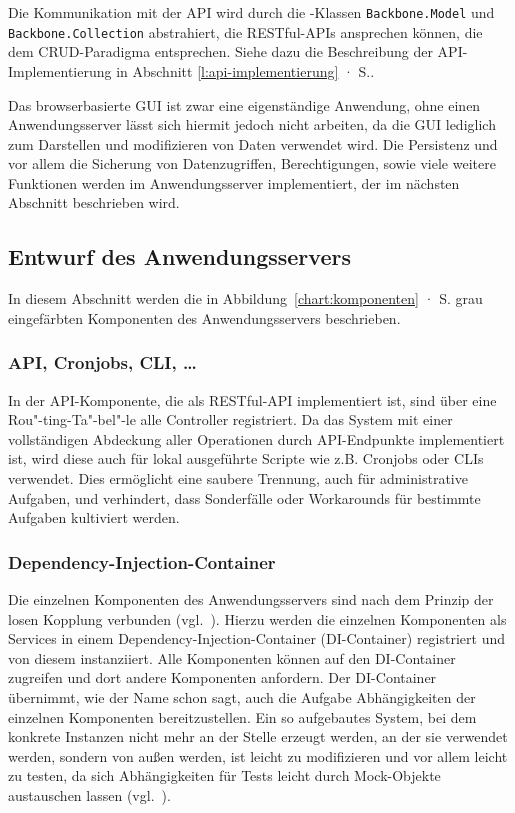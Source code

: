 Die Kommunikation mit der API wird durch die -Klassen \texttt{Backbone.Model} und \texttt{Backbone.Collection} abstrahiert, die RESTful-APIs ansprechen können, die dem CRUD-Paradigma entsprechen. Siehe dazu die Beschreibung der API-Implementierung in Abschnitt \ref{l:api-implementierung} · S.\pageref{l:api-implementierung}.

\secbar

Das browserbasierte GUI ist zwar eine eigenständige Anwendung, ohne einen Anwendungsserver lässt sich hiermit jedoch nicht arbeiten, da die GUI lediglich zum Darstellen und modifizieren von Daten verwendet wird. Die Persistenz und vor allem die Sicherung von Datenzugriffen, Berechtigungen, sowie viele weitere Funktionen werden im Anwendungsserver implementiert, der im nächsten Abschnitt beschrieben wird.

\pagebreak

\subsection{Entwurf des Anwendungsservers}\label{l:entwurf-server}

In diesem Abschnitt werden die in Abbildung~\ref{chart:komponenten} · S.\pageref{chart:komponenten} grau eingefärbten Komponenten des Anwendungsservers beschrieben.

\subsubsection{API, Cronjobs, CLI, …}

In der API-Komponente, die als RESTful-API implementiert ist, sind über eine Rou"-ting-Ta"-bel"-le alle Controller registriert. Da das System mit einer vollständigen Abdeckung aller Operationen durch API-Endpunkte implementiert ist, wird diese auch für lokal ausgeführte Scripte wie z.B. Cronjobs oder CLIs verwendet. Dies ermöglicht eine saubere Trennung, auch für administrative Aufgaben, und verhindert, dass Sonderfälle oder Workarounds für bestimmte Aufgaben kultiviert werden.

\subsubsection{Dependency-Injection-Container}

Die einzelnen Komponenten des Anwendungsservers sind nach dem Prinzip der losen Kopplung verbunden (vgl.~\cite[S.62]{hn-web20}). Hierzu werden die einzelnen Komponenten als Services in einem Dependency-Injection-Container (DI-Container) registriert und von diesem instanziiert. Alle Komponenten können auf den DI-Container zugreifen und dort andere Komponenten anfordern. Der DI-Container übernimmt, wie der Name schon sagt, auch die Aufgabe Abhängigkeiten der einzelnen Komponenten bereitzustellen. Ein so aufgebautes System, bei dem konkrete Instanzen nicht mehr an der Stelle erzeugt werden, an der sie verwendet werden, sondern von außen  werden, ist leicht zu modifizieren und vor allem leicht zu testen, da sich Abhängigkeiten für Tests leicht durch Mock-Objekte austauschen lassen (vgl.~\cite[Kap.2]{freeman2009growing}).

